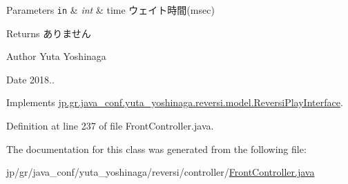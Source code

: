 \begin{DoxyParams}[1]{Parameters}
\mbox{\tt in}  & {\em int} & time ウェイト時間(msec) \\
\hline
\end{DoxyParams}
\begin{DoxyReturn}{Returns}
ありません 
\end{DoxyReturn}
\begin{DoxyAuthor}{Author}
Yuta Yoshinaga 
\end{DoxyAuthor}
\begin{DoxyDate}{Date}
2018.. 
\end{DoxyDate}


Implements \mbox{\hyperlink{interfacejp_1_1gr_1_1java__conf_1_1yuta__yoshinaga_1_1reversi_1_1model_1_1_reversi_play_interface}{jp.\+gr.\+java\+\_\+conf.\+yuta\+\_\+yoshinaga.\+reversi.\+model.\+Reversi\+Play\+Interface}}.



Definition at line 237 of file Front\+Controller.\+java.



The documentation for this class was generated from the following file\+:\begin{DoxyCompactItemize}
\item 
jp/gr/java\+\_\+conf/yuta\+\_\+yoshinaga/reversi/controller/\mbox{\hyperlink{_front_controller_8java}{Front\+Controller.\+java}}\end{DoxyCompactItemize}
